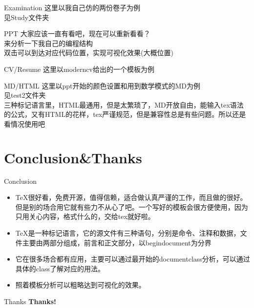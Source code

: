 \documentclass[fontset = none]{beamer}
\begin{document}
\begin{frame}{Examination}
    这里以我自己仿的两份卷子为例
    \\见Study文件夹
\end{frame}
\begin{frame}{PPT}
    大家应该一直有看吧，现在可以重新看看？
    \\来分析一下我自己的编程结构
    \\双击可以到达对应代码位置，实现可视化效果(大概位置)
\end{frame}
\begin{frame}{CV/Resume}
    这里以moderncv给出的一个模板为例
\end{frame}
\begin{frame}{MD/HTML}
    这里以ppt开始的颜色设置和用到数学模式的MD为例
    \\见test2文件夹
    \\三种标记语言里，HTML最通用，但是太繁琐了，MD开放自由，能输入tex语法的公式，又有HTML的花样，tex严谨规范，但是兼容性总是有些问题。所以还是看情况使用吧
\end{frame}
\section{Conclusion\&Thanks}
\begin{frame}{Conclusion}
    \begin{itemize}
        \item \TeX{}很好看，免费开源，值得信赖，适合做认真严谨的工作，而且做的很好。但是别的场合用它就有些力不从心了吧。一个写好的模板会很方便使用，因为只用关心内容，格式什么的，交给tex就好啦。
        \item \TeX{}是一种标记语言，它的源文件有三种语句，分别是命令、注释和数据，文件主要由两部分组成，前言和正文部分，以begin{document}为分界
        \item 它在很多场合都有应用，主要可以通过最开始的documentclass分析，可以通过具体的class了解对应的用法。%
        \item 照着模板分析可以粗略达到可视化的效果。
    \end{itemize}
\end{frame}
\begin{frame}{Thanks}
    \textbf{Thanks!}
\end{frame}
\end{document}
